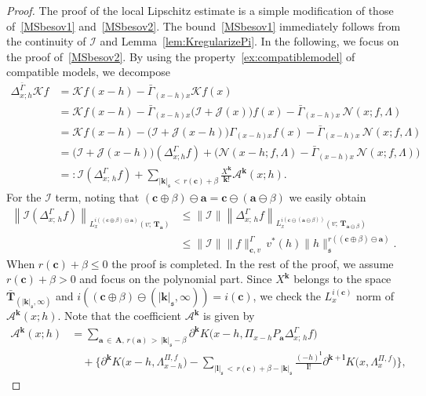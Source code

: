\documentclass[AHL,Unicode,longabstracts,published]{cedram}
\newcommand{\mfs}{\mathfrak{s}}
\newcommand{\bfa}{\mathbf{a}}
\newcommand{\bfc}{\mathbf{c}}
\newcommand{\bfcpb}{\mathbf{c}\oplus\beta}
\newcommand{\bfA}{\mathbf{A}}
\newcommand{\bfT}{\mathbf{T}}
\newcommand{\bfk}{\mathbf{k}}
\newcommand{\bfl}{\mathbf{l}}
\newcommand{\mcK}{\mathcal{K}}
\newcommand{\mcI}{\mathcal{I}}
\newcommand{\mcJ}{\mathcal{J}}
\newcommand{\mcN}{\mathcal{N}}
\newcommand{\mcA}{\mathcal{A}}
\begin{document}
\begin{proof}
The proof of the local Lipschitz estimate is a simple modification of those of~\eqref{MSbesov1} and~\eqref{MSbesov2}. The bound~\eqref{MSbesov1} immediately follows from the continuity of $\mcI$ and Lemma~\ref{lem:KregularizePi}. In the following, we focus on the proof of~\eqref{MSbesov2}. By using the property~\eqref{ex:compatiblemodel} of compatible models, we decompose
\begin{align*}
\Delta_{x;h}^{\bar\Gamma}\mcK f&=\mcK f(x-h)-\bar\Gamma_{(x-h)x}\mcK f(x)\\
&=\mcK f(x-h)-\bar\Gamma_{(x-h)x}\big(\mcI+\mcJ(x)\big)f(x)-\bar\Gamma_{(x-h)x}\,\mcN(x;f,\Lambda)\\
&=\mcK f(x-h)-\big(\mcI+\mcJ(x-h)\big)\Gamma_{(x-h)x}f(x)-\bar\Gamma_{(x-h)x}\,\mcN(x;f,\Lambda)\\
&=\big(\mcI+\mcJ(x-h)\big)(\Delta_{x;h}^\Gamma f) +\big(\mcN(x-h;f,\Lambda)-\bar\Gamma_{(x-h)x}\,\mcN(x;f,\Lambda)\big)\\
&=:\mcI\left(\Delta_{x;\,h}^\Gamma f\right)+\sum_{|{\bfk}|_{\mfs}\,<\,r(\bfc)+\beta}\frac{X^{\bfk}}{{\bfk}!}\mcA^{\bfk}(x;h).
\end{align*}
For the $\mcI$ term, noting that $(\bfcpb)\ominus\bfa=\bfc\ominus(\bfa\ominus\beta)$ we easily obtain
\begin{align*}
\left\|\mcI\left(\Delta_{x;\,h}^\Gamma f\right)\right\|_{L_x^{i((\bfcpb)\ominus\bfa)}(v;\,\bfT_\bfa)} &\le\|\mcI\|\left\|\Delta_{x;\,h}^\Gamma f\right\|_{L_x^{i(\bfc\ominus(\bfa\ominus\beta))}(v;\,\bfT_{\bfa\ominus\beta})}\\
&\le\|\mcI\|\|f\|_{\bfc,v}^\Gamma\, v^*(h)\|h\|_\mfs^{r((\bfcpb)\ominus\bfa)}.
\end{align*}
When $r(\bfc)+\beta\le0$ the proof is completed. In the rest of the proof, we assume $r(\bfc)+\beta>0$ and focus on the polynomial part. Since $X^{{\bfk}}$ belongs to the space $\bar{\bfT}_{(|{\bfk}|_{\mfs},\infty)}$ and $i((\bfc\oplus\beta)\ominus(|{\bfk}|_\mfs,\infty))=i(\bfc)$, we check the $L_x^{i(\bfc)}$ norm of $\mcA^{\bfk}(x;h)$. Note that the coefficient $\mcA^{\bfk}$ is given by
\begin{align*}
\mcA^{\bfk}(x;h)&=\sum_{\bfa\,\in\,\bfA,\,r(\bfa)\,>\,|{\bfk}|_{\mfs}-\beta}\partial^{\bfk}K\big(x-h,\Pi_{x-h} P_\bfa\Delta_{x;\,h}^\Gamma f\big)\\
&\quad+\bigg\{\partial^{\bfk}K\big(x-h, \Lambda_{x-h}^{\Pi,f}\big) -\sum_{|{\bfl}|_\mfs\,<\,r(\bfc)+\beta-|{\bfk}|_\mfs}\frac{(-h)^{\bfl}}{{\bfl}!}\partial^{{\bfk}+{\bfl}}K\big(x,\Lambda_x^{\Pi,f}\big)\bigg\},

\end{align*}
\end{proof}
\end{document}

